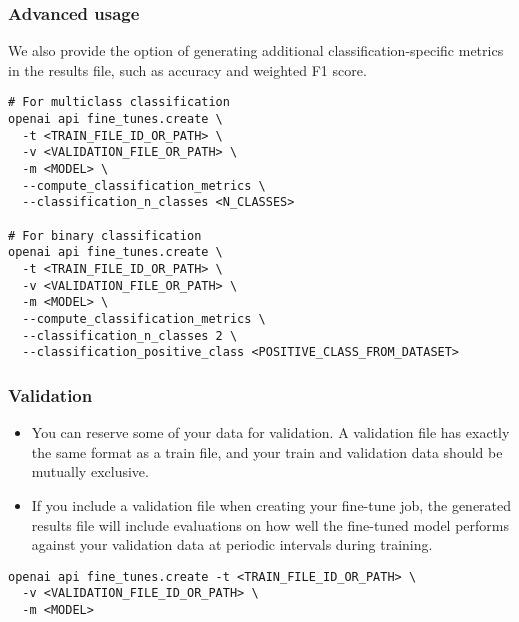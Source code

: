 \begin{frame}[fragile]\frametitle{Advanced usage}

We also provide the option of generating additional classification-specific metrics in the results file, such as accuracy and weighted F1 score.



\begin{lstlisting}
# For multiclass classification
openai api fine_tunes.create \
  -t <TRAIN_FILE_ID_OR_PATH> \
  -v <VALIDATION_FILE_OR_PATH> \
  -m <MODEL> \
  --compute_classification_metrics \
  --classification_n_classes <N_CLASSES>

# For binary classification
openai api fine_tunes.create \
  -t <TRAIN_FILE_ID_OR_PATH> \
  -v <VALIDATION_FILE_OR_PATH> \
  -m <MODEL> \
  --compute_classification_metrics \
  --classification_n_classes 2 \
  --classification_positive_class <POSITIVE_CLASS_FROM_DATASET>
\end{lstlisting}	
\end{frame}

\begin{frame}[fragile]\frametitle{Validation}

\begin{itemize}
\item You can reserve some of your data for validation. A validation file has exactly the same format as a train file, and your train and validation data should be mutually exclusive.
\item 
If you include a validation file when creating your fine-tune job, the generated results file will include evaluations on how well the fine-tuned model performs against your validation data at periodic intervals during training.
\end{itemize}


\begin{lstlisting}
openai api fine_tunes.create -t <TRAIN_FILE_ID_OR_PATH> \
  -v <VALIDATION_FILE_ID_OR_PATH> \
  -m <MODEL>
\end{lstlisting}	
\end{frame}

